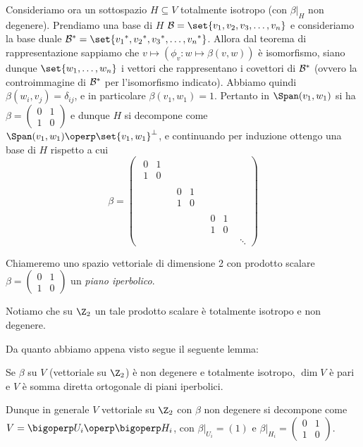 Consideriamo ora un sottospazio $H \subseteq V$ totalmente isotropo (con $\beta|_H$ non degenere). Prendiamo una base di $H$ $\base = \set{v_1, v_2, v_3, \dots, v_n}$ e consideriamo la base duale $\base\dual = \set{v_1\dual, v_2\dual, v_3\dual, \dots, v_n\dual}$. Allora dal teorema di rappresentazione sappiamo che 
$v \mapsto (\phi_v : w \mapsto \beta(v,w))$ è isomorfismo, siano dunque $\set{w_1, \dots, w_n}$ i vettori che rappresentano i covettori di $\mathcal{B}{^\ast}$ (ovvero la controimmagine di $\mathcal{B}{^\ast}$ per l'isomorfismo indicato). Abbiamo quindi $\beta(w_i, v_j) = \delta_{ij}$, e in particolare $\beta(v_1, w_1) = 1$. Pertanto in $\Span(v_1, w_1)$ si ha $\beta = \left(\begin{smallmatrix} 0 & 1 \\ 1 & 0 \end{smallmatrix}\right)$ e dunque $H$ si decompone come $\Span(v_1, w_1) \operp \set{v_1, w_1}^\perp$, e continuando per induzione ottengo una base di $H$ rispetto a cui \[
\newcommand*\ROTIDMAT{\begin{matrix}0 & 1 \\ 1 & 0\end{matrix}}
\beta =
\begin{pmatrix}
	\ROTIDMAT \\
	& \ROTIDMAT \\
	& & \ROTIDMAT \\
	& & & \ddots
\end{pmatrix}
\]

\begin{defn}
Chiameremo uno spazio vettoriale di dimensione 2 con prodotto scalare $\beta = \left(\begin{smallmatrix} 0 & 1 \\ 1 & 0 \end{smallmatrix}\right)$ un \emph{piano iperbolico}.
\end{defn}
Notiamo che su $\Z_2$ un tale prodotto scalare è totalmente isotropo e non degenere.

Da quanto abbiamo appena visto segue il seguente lemma:
\begin{lemma}[Lemma 2]
	Se $\beta$ su $V$ (vettoriale su $\Z_2$) è non degenere e totalmente isotropo, $\dim V$ è pari e $V$ è somma diretta ortogonale di piani iperbolici.
\end{lemma}

Dunque in generale $V$ vettoriale su $\Z_2$ con $\beta$ non degenere si decompone come $V = \bigoperp U_i \operp \bigoperp H_i$, con $\beta|_{U_i} = (1)$ e $\beta|_{H_i} = \left(\begin{smallmatrix} 0 & 1 \\ 1 & 0 \end{smallmatrix}\right)$.

